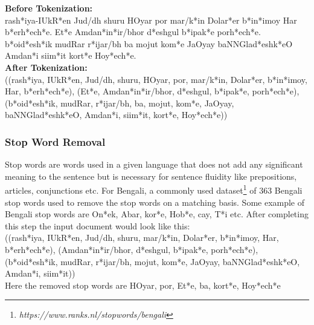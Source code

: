 \textbf{Before Tokenization:}\\
{\bng
    ra\*sh*iya-IU\*kR*en Jud/dh shuru HOyar por ma\*r/k*in Dola\*r*er \*b*i\*n*imoy Har \*b*e\*rh*e\*ch*e.
    E\*t*e Amda\*n*i\*n*ir/bhor \*d*eshgul \*b*ipa\*k*e po\*rh*e\*ch*e.
    \*b*{oi}\*d*e\*sh*ik mudRar \*r*ijar/bh ba mojut ko\*m*e JaOyay baNNGla\*d*esh\*k*eO Amda\*n*i sii\*m*it
    kor\*t*e Ho\*y*e\*ch*e.
}\\

\textbf{After Tokenization:}\\
{\bng
    ((ra\*sh*iya, IU\*kR*en, Jud/dh, shuru, HOyar, por, ma\*r/k*in, Dola\*r*er, \*b*i\*n*imoy, Har, \*b*e\*rh*e\*ch*e),
    (E\*t*e, Amda\*n*i\*n*ir/bhor, \*d*eshgul, \*b*ipa\*k*e, po\*rh*e\*ch*e),
    (\*b*{oi}\*d*e\*sh*ik, mudRar, \*r*ijar/bh, ba, mojut, ko\*m*e, JaOyay, baNNGla\*d*esh\*k*eO, Amda\*n*i,
    sii\*m*it, kor\*t*e, Ho\*y*e\*ch*e))
}

\subsubsection{Stop Word Removal}
Stop words are words used in a given language that does not add any significant meaning to the sentence but
is necessary for sentence fluidity like prepositions, articles, conjunctions etc.
For Bengali, a commonly used dataset\footnote{\textit{https://www.ranks.nl/stopwords/bengali}} of 363 Bengali stop
words used to remove the stop words on a matching basis.
Some example of Bengali stop words are {\bng O\*n*ek, Abar, ko\*r*e, Ho\*b*e, cay, \*T*i} etc.
After completing this step the input document would look like this:\\
{\bng
    ((ra\*sh*iya, IU\*kR*en, Jud/dh, shuru, ma\*r/k*in, Dola\*r*er, \*b*i\*n*imoy, Har, \*b*e\*rh*e\*ch*e),
    (Amda\*n*i\*n*ir/bhor, \*d*eshgul, \*b*ipa\*k*e, po\*rh*e\*ch*e),
    (\*b*{oi}\*d*e\*sh*ik, mudRar, \*r*ijar/bh, mojut, ko\*m*e, JaOyay, baNNGla\*d*esh\*k*eO, Amda\*n*i, sii\*m*it))
}\\
Here the removed stop words are {\bng HOyar, por, E\*t*e, ba, kor\*t*e, Ho\*y*e\*ch*e}

